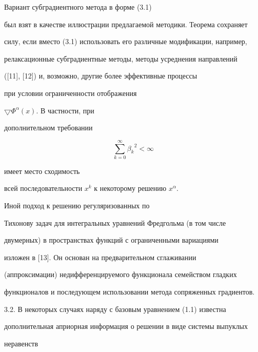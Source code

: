 \begin{notes}


Вариант субградиентного метода в форме (3.1)


был взят в качестве иллюстрации предлагаемой методики. Теорема сохраняет


силу, если вместо (3.1) использовать его различные модификации, например,


релаксационные субградиентные методы, методы усреднения направлений


([11], [12]) и, возможно, другие более эффективные процессы


при условии ограниченности отображения


$\bigtriangledown\Phi^\alpha(x)$. В частности, при


дополнительном требовании


$$


\sum_{k=0}^{\infty}{\beta_k}^2 < \infty


$$


имеет место сходимость


всей последовательности $x^k$ к некоторому решению $x^{\alpha}$.


\end{notes}





\begin{notes}


Иной подход к решению регуляризованных по


Тихонову задач для интегральных уравнений Фредгольма (в том числе


двумерных) в пространствах функций с ограниченными вариациями


изложен в [13]. Он основан на предварительном сглаживании


(аппроксимации) недифференцируемого функционала семейством гладких


функционалов и последующем использовании метода сопряженных градиентов.


\end{notes}





3.2. В некоторых случаях наряду с базовым уравнением (1.1) известна


дополнительная априорная информация о решении в виде системы выпуклых


неравенств


$$


